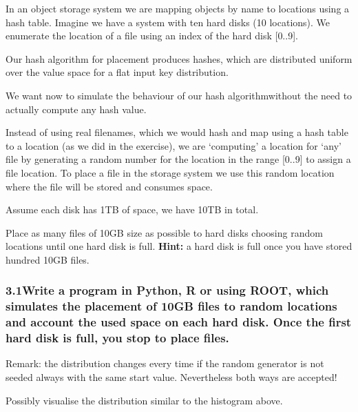 \documentclass[11pt]{article}
\begin{document}
In an object storage system we are mapping objects by name to locations
using a hash table. Imagine we have a system with ten hard disks (10
locations). We enumerate the location of a file using an index of the
hard disk {[}0..9{]}.

Our hash algorithm for placement produces hashes, which are distributed
uniform over the value space for a flat input key distribution.

We want now to simulate the behaviour of our hash algorithmwithout the
need to actually compute any hash value.

Instead of using real filenames, which we would hash and map using a
hash table to a location (as we did in the exercise), we are `computing'
a location for `any' file by generating a random number for the location
in the range {[}0..9{]} to assign a file location. To place a file in
the storage system we use this random location where the file will be
stored and consumes space.

Assume each disk has 1TB of space, we have 10TB in total.

Place as many files of 10GB size as possible to hard disks choosing
random locations until one hard disk is full. \textbf{Hint:} a hard disk
is full once you have stored hundred 10GB files.

    \hypertarget{write-a-program-in-python-r-or-using-root-which-simulates-the-placement-of-10gb-files-to-random-locations-and-account-the-used-space-on-each-hard-disk.-once-the-first-hard-disk-is-full-you-stop-to-place-files.}{%
\subsubsection{3.1Write a program in Python, R or using ROOT, which
simulates the placement of 10GB files to random locations and account
the used space on each hard disk. Once the first hard disk is full, you
stop to place
files.}\label{write-a-program-in-python-r-or-using-root-which-simulates-the-placement-of-10gb-files-to-random-locations-and-account-the-used-space-on-each-hard-disk.-once-the-first-hard-disk-is-full-you-stop-to-place-files.}}

Remark: the distribution changes every time if the random generator is
not seeded always with the same start value. Nevertheless both ways are
accepted!

Possibly visualise the distribution similar to the histogram above.
\end{document}
